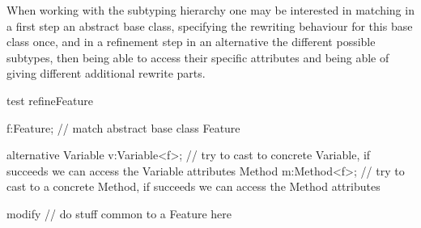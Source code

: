 \begin{example} \label{ex:retypelhs}
When working with the subtyping hierarchy one may be interested in matching in a first step an abstract base class,
specifying the rewriting behaviour for this base class once,
and in a refinement step in an alternative the different possible subtypes, 
then being able to access their specific attributes and being able of giving different additional rewrite parts.
	\begin{grgen}
test refineFeature
{
  f:Feature; // match abstract base class Feature

  alternative {
    Variable {
      v:Variable<f>; // try to cast to concrete Variable, if succeeds we can access the Variable attributes
    }
    Method {
      m:Method<f>; // try to cast to a concrete Method, if succeeds we can access the Method attributes
    }
  }
  
  modify {
    // do stuff common to a Feature here
  }
}
	\end{grgen}
\end{example}


